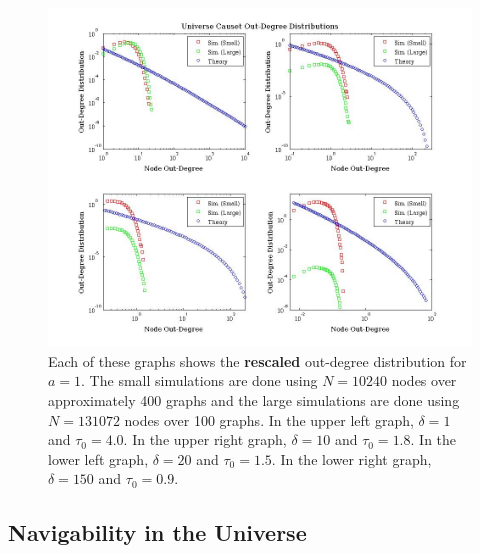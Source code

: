 \documentclass[preprint,notitlepage,amsmath,amssymb,floatfix]{revtex4-1}
\begin{document}
\begin{figure}
\includegraphics[width=18cm]{figures/out_degrees.jpg}
\caption{Each of these graphs shows the \textbf{rescaled} out-degree distribution for $a = 1$.  The small simulations are done using $N = 10240$ nodes over approximately 400 graphs and the large simulations are done using $N = 131072$ nodes over 100 graphs.  In the upper left graph, $\delta = 1$ and $\tau_0 = 4.0$.  In the upper right graph, $\delta = 10$ and $\tau_0 = 1.8$.  In the lower left graph, $\delta = 20$ and $\tau_0 = 1.5$.  In the lower right graph, $\delta = 150$ and $\tau_0 = 0.9$.}
\label{fig:out_deg_uni}
\centering
\end{figure}

\subsection{Navigability in the Universe}
\end{document}

